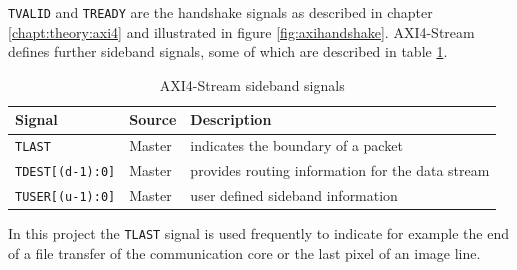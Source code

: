 \texttt{TVALID} and \texttt{TREADY} are the handshake signals as described in chapter 
\ref{chapt:theory:axi4} and illustrated in figure \ref{fig:axihandshake}.
AXI4-Stream defines further sideband signals, some of which are described in
table \ref{tab:axi4steramside}.

\begin{table}[h]
    \centering
    \begin{tabular}{ l  l l}
        \toprule
        Signal & Source & Description \\
        \midrule
        \texttt{TLAST} & Master & indicates the boundary of a packet \\
        \texttt{TDEST[(d-1):0]} & Master & provides routing information for the data stream \\
        \texttt{TUSER[(u-1):0]} & Master & user defined sideband information \\
        \bottomrule
    \end{tabular}
    \caption{AXI4-Stream sideband signals}
    \label{tab:axi4steramside}
\end{table}

In this project the \texttt{TLAST} signal is used frequently to indicate for
example the end of a file transfer of the communication core or the last pixel
of an image line.

